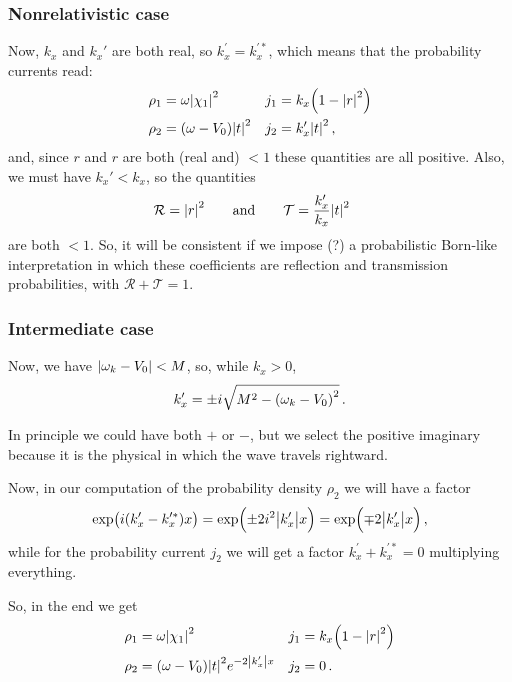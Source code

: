 \documentclass[main.tex]{subfiles}
\begin{document}
\subsubsection{Nonrelativistic case}

Now, \(k_x\) and \(k_x'\) are both real, so \(k_x^{\prime } = k_x^{\prime *}\), which means that the probability currents read: 
%
\begin{align}
\rho_1 &= \omega \abs{\chi_1 }^2
&
j_1 &= k_x \qty(1 - \abs{r}^2) \\
\rho_2 &= (\omega - V_0 ) \abs{t}^2 
&
j_2 &=  k_x^{\prime } \abs{t}^2 
\,,
\end{align}
%
and, since \(r\) and \(r\) are both (real and) \(<1\) these quantities are all positive. Also, we must have \(k_x' < k_x\), so the quantities 
%
\begin{align}
\mathcal{R} &= \abs{r}^2
\qquad \text{and} \qquad
\mathcal{T} = \frac{k_x'}{k_x} \abs{t}^2
\,
\end{align}
%
are both \(<1\). So, it will be consistent if we impose (?) a probabilistic Born-like interpretation in which these coefficients are reflection and transmission probabilities, with \(\mathcal{R} + \mathcal{T} = 1\).

\subsubsection{Intermediate case}

Now, we have \(\abs{\omega_{k} - V_0 } < M\), so, while \(k_x>0\), 
%
\begin{align}
k_x' = \pm i \sqrt{M^2 - \qty(\omega_{k} - V_0 )^2}
\,.
\end{align}

In principle we could have both \(+\) or \(-\), but we select the positive imaginary because it is the physical in which the wave travels rightward. 

Now, in our computation of the probability density \(\rho_2 \) we will have a factor 
%
\begin{align}
\exp(i (k_x' - k_x^{\prime *})x) = \exp(\pm 2 i^2 \abs{k_x'}x) =  \exp(\mp 2 \abs{k_x^{\prime }} x)
\,,
\end{align}
%
while for the probability current \(j_2 \) we will get a factor \(k_x^{\prime } + k_x^{\prime *} = 0 \) multiplying everything.

So, in the end we get 
%
\begin{align}
\rho_1 &= \omega \abs{\chi_1 }^2
&
j_1 &= k_x \qty(1 - \abs{r}^2) \\
\rho_2 &= (\omega - V_0 ) \abs{t}^2 e^{-2 \abs{k_x^{\prime }} x}
&
j_2 &= 0 
\,.
\end{align}
\end{document}
